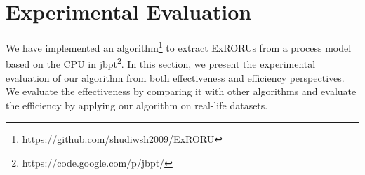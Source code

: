 \documentclass{llncs}
\begin{document}

\section{Experimental Evaluation}\label{sec:experiments}
We have implemented an algorithm\footnote{https://github.com/shudiwsh2009/ExRORU} to extract ExRORUs from a process model based on the CPU in jbpt\footnote{https://code.google.com/p/jbpt/}. In this section, we present the experimental evaluation of our algorithm from both effectiveness and efficiency perspectives. We evaluate the effectiveness by comparing it with other algorithms and evaluate the efficiency by applying our algorithm on real-life datasets.
\end{document}
